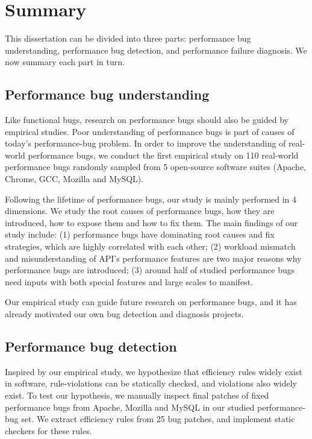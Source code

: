 \section{Summary}
\label{sec:7_summary}
This dissertation can be divided into three parts: 
performance bug understanding, performance bug detection, and performance failure diagnosis. 
We now summary each part in turn. 

\subsection{Performance bug understanding}

Like functional bugs, research on performance bugs should also be guided by empirical studies. 
Poor understanding of performance bugs is part of causes of today's performance-bug problem. 
In order to improve the understanding of real-world performance bugs, 
we conduct the first empirical study on 110 real-world performance bugs 
randomly sampled from 5 open-source software suites (Apache, Chrome, GCC, Mozilla and MySQL).  

Following the lifetime of performance bugs, our study is mainly performed in 4 dimensions. 
We study the root causes of performance bugs, how they are introduced, how to expose them and how to fix them. 
The main findings of our study include: 
(1) performance bugs have dominating root causes and fix strategies, 
which are highly correlated with each other; 
(2) workload mismatch and misunderstanding of API's performance features 
are two major reasons why performance bugs are introduced; 
(3) around half of studied performance bugs need inputs with both special features 
and large scales to manifest. 


Our empirical study can guide future research on performance bugs, 
and it has already motivated our own bug detection and diagnosis projects.

\subsection{Performance bug detection}

Inspired by our empirical study, 
we hypothesize that efficiency rules widely exist in software, 
rule-violations can be statically checked, and violations also widely exist. 
To test our hypothesis, we manually inspect final patches of fixed performance bugs from
Apache, Mozilla and MySQL in our studied performance-bug set. 
We extract efficiency rules from 25 bug patches, and implement static checkers for these rules. 

